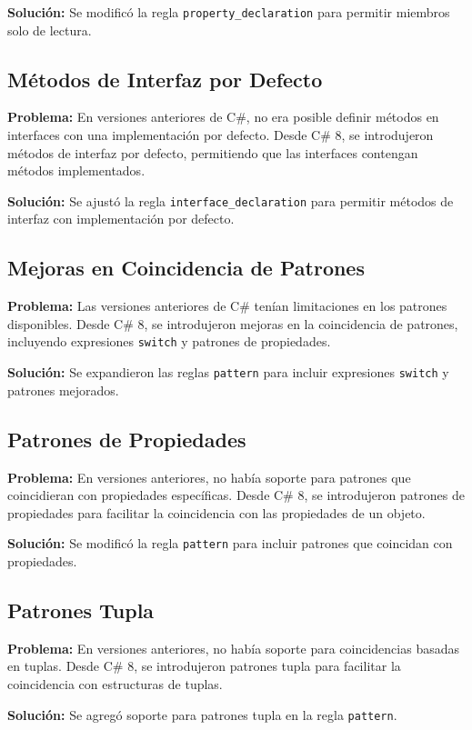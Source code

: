 \textbf{Solución:} Se modificó la regla \texttt{property\_declaration} para permitir miembros solo de lectura.

\subsection{Métodos de Interfaz por Defecto}
\textbf{Problema:} En versiones anteriores de C\#, no era posible definir métodos en interfaces con una implementación por defecto. Desde C\# 8, se introdujeron métodos de interfaz por defecto, permitiendo que las interfaces contengan métodos implementados.

\textbf{Solución:} Se ajustó la regla \texttt{interface\_declaration} para permitir métodos de interfaz con implementación por defecto.

\subsection{Mejoras en Coincidencia de Patrones}
\textbf{Problema:} Las versiones anteriores de C\# tenían limitaciones en los patrones disponibles. Desde C\# 8, se introdujeron mejoras en la coincidencia de patrones, incluyendo expresiones \texttt{switch} y patrones de propiedades.

\textbf{Solución:} Se expandieron las reglas \texttt{pattern} para incluir expresiones \texttt{switch} y patrones mejorados.

\subsection{Patrones de Propiedades}
\textbf{Problema:} En versiones anteriores, no había soporte para patrones que coincidieran con propiedades específicas. Desde C\# 8, se introdujeron patrones de propiedades para facilitar la coincidencia con las propiedades de un objeto.

\textbf{Solución:} Se modificó la regla \texttt{pattern} para incluir patrones que coincidan con propiedades.

\subsection{Patrones Tupla}
\textbf{Problema:} En versiones anteriores, no había soporte para coincidencias basadas en tuplas. Desde C\# 8, se introdujeron patrones tupla para facilitar la coincidencia con estructuras de tuplas.

\textbf{Solución:} Se agregó soporte para patrones tupla en la regla \texttt{pattern}.

